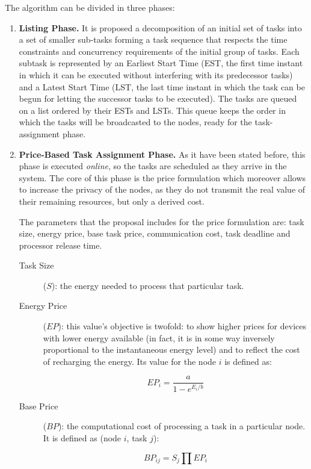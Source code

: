 The algorithm can be divided in three phases:

\begin{enumerate}
\item \textbf{Listing Phase. } It is proposed a decomposition of an initial set of tasks into a set of smaller sub-tasks forming a task sequence that respects the time constraints and concurrency requirements of the initial group of tasks. Each subtask is represented by an Earliest Start Time (EST, the first time instant in which it can be executed without interfering with its predecessor tasks) and a Latest Start Time (LST, the last time instant in which the task can be begun for letting the successor tasks to be executed). The tasks are queued on a list ordered by their ESTs and LSTs. This queue keeps the order in which the tasks will be broadcasted to the nodes, ready for the task-assignment phase.
\item \textbf{Price-Based Task Assignment Phase. } As it have been stated before, this phase is executed \emph{online}, so the tasks are scheduled  as they arrive in the system. The core of this phase is the price formulation which moreover allows to increase the privacy of the nodes, as they do not transmit the real value of their remaining resources, but only a derived cost.

The parameters that the proposal includes for the price formulation are: task size, energy price, base task price, communication cost, task deadline and processor release time.
\begin{description}
\item[Task Size] ($ S $): the energy needed to process that particular task.
\item[Energy Price] ($ EP $): this value's objective is twofold: to show higher prices for devices with lower energy available (in fact, it is in some way inversely proportional to the instantaneous energy level) and to reflect the cost of recharging the energy. Its value for the node $i$ is defined as:

\begin{equation}
EP_i = \frac{a}{1-e^{E_i/b}}
\end{equation}
 
\item[Base Price] ($ BP $): the computational cost of processing a task in a particular node. It is defined as (node $i$, task $j$):

\begin{equation}
BP_{ij} = S_j \prod EP_i
\end{equation}


\end{description}
\end{enumerate}
